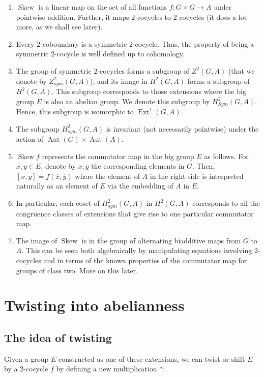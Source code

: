 \documentclass[10pt]{amsart}
\newcommand{\Skew}{\operatorname{Skew}}
\newcommand{\Aut}{\operatorname{Aut}}
\newcommand{\Ext}{\operatorname{Ext}}
\begin{document}
\begin{enumerate}
  \begin{enumerate}
  \item $\Skew$ is a linear map on the set of all functions $f:G
    \times G \to A$ under pointwise addition. Further, it maps
    $2$-cocycles to $2$-cocycles (it does a lot more, as we shall see
    later).
  \item Every $2$-coboundary is a symmetric $2$-cocycle. Thus, the
    property of being a symmetric $2$-cocycle is well defined up to
    cohomology.
  \item The group of symmetric $2$-cocycles forms a subgroup of
    $Z^2(G,A)$ (that we denote by $Z^2_{sym}(G,A)$), and its image in
    $H^2(G,A)$ forms a subgroup of $H^2(G,A)$. This subgroup
    corresponds to those extensions where the big group $E$ is also an
    abelian group. We denote this subgroup by $H^2_{Sym}(G,A)$. Hence,
    this subgroup is isomorphic to $\Ext^1(G,A)$.
  \item The subgroup $H^2_{sym}(G,A)$ is invariant (not necessarily
    pointwise) under the action of $\Aut(G) \times \Aut(A)$.
  \item $\Skew f$ represents the commutator map in the big group $E$
    as follows. For $x,y \in E$, denote by $\overline{x},
    \overline{y}$ the corresponding elements in $G$. Then, $[x,y] =
    f(\overline{x},\overline{y})$ where the element of $A$ in the
    right side is interpreted naturally as an element of $E$ via the
    embedding of $A$ in $E$.
  \item In particular, each coset of $H^2_{sym}(G,A)$ in $H^2(G,A)$
    corresponds to all the congruence classes of extensions that give
    rise to one particular commutator map.
  \item The image of $\Skew$ is in the group of alternating biadditive
    maps from $G$ to $A$. This can be seen both algebraically by
    manipulating equations involving $2$-cocycles and in terms of the
    known properties of the commutator map for groups of class
    two. More on this later.
  \end{enumerate}
\end{enumerate}

\section{Twisting into abelianness}

\subsection{The idea of twisting}
Given a group $E$ constructed as one of these extensions, we can twist
or shift $E$ by a $2$-cocycle $f$ by defining a new multiplication
$*$:
\end{document}
